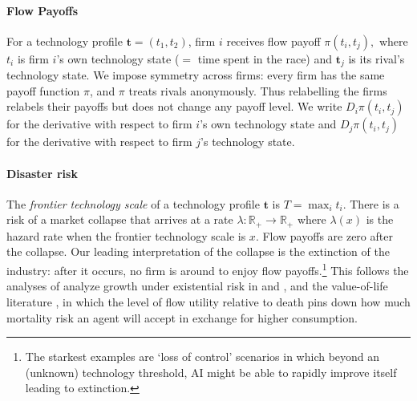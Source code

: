 \documentclass[12pt,reqno]{article}
\newcommand{\R}{\mathbb{R}}
\theoremstyle{definition} \newtheorem{example}{Example}
\theoremstyle{definition} \newtheorem{condition}{Condition}
\theoremstyle{definition} \newtheorem{corollary}{Corollary}
\theoremstyle{definition} \newtheorem{claim}{Claim}
\theoremstyle{definition} \newtheorem{definition}{Definition}
\theoremstyle{definition} \newtheorem{conjecture}{Conjecture}
\theoremstyle{definition} \newtheorem{Lemma}{Lemma}
\theoremstyle{definition} \newtheorem{lemma}{Lemma}
\theoremstyle{plain} \newtheorem{theorem}{Theorem}
\theoremstyle{definition} \newtheorem{assumption}{Assumption}
\theoremstyle{definition} \newtheorem*{assumptionnonumber}{Assumption}
\theoremstyle{definition} \newtheorem*{theoremNoNumber}{Proposition}
\theoremstyle{definition}
\theoremstyle{definition}\newtheorem{proposition}{Proposition}
\theoremstyle{definition} \newtheorem{result}{Result}
\theoremstyle{definition} \newtheorem*{definitionNoNumber}{Definition}
\theoremstyle{definition} \newtheorem{Definition}{Definition}
\theoremstyle{definition} \newtheorem*{DefinitionNoNumber}{Definition}
\theoremstyle{definition} \newtheorem*{fact}{Fact}
\theoremstyle{definition} \newtheorem*{property}{Property}
\theoremstyle{definition} \newtheorem{remark}{Remark}
\begin{document}
\paragraph{Flow Payoffs} For a technology profile $\bm t=(t_1,t_2)$, firm $i$ receives flow payoff
$
\pi(t_i,t_j),
$
where $t_i$ is firm $i$'s own technology state ($=$ time spent in the race) and $\bm{t}_{j}$ is its rival's technology state. We impose symmetry across firms: every firm has the same payoff function $\pi$, and $\pi$ treats rivals anonymously. Thus relabelling the firms relabels their payoffs but does not change any payoff level. We write $D_i \pi(t_i,t_j)$ for the derivative with respect to firm $i$'s own technology state and $D_j\pi(t_i,t_j)$ for the derivative with respect to firm $j$'s technology state.


\paragraph{Disaster risk} The \emph{frontier technology scale} of a technology profile $\bm t$ is $T=\max_i t_i$. There is a risk of a market collapse that arrives at a rate $\lambda: \R_+ \to \R_+$ where $\lambda(x)$ is the hazard rate when the frontier technology scale is $x$. Flow payoffs are zero after the collapse. Our leading interpretation of the collapse is the extinction of the industry: after it occurs, no firm is around to enjoy flow payoffs.\footnote{The starkest examples are `loss of control' scenarios in which beyond an (unknown) technology threshold, AI might be able to rapidly improve itself leading to extinction\citep{bostrom2014superintelligence,bengio2024managing}.}  This follows the analyses of analyze growth under existential risk in \citet{jones2024ai} and \citet{trammell2024existential}, and the value-of-life literature \citep{rosen1988value,murphy2006value,hall2007value}, in which the level of flow utility relative to death pins down how much mortality risk an agent will accept in exchange for higher consumption.
\end{document}
